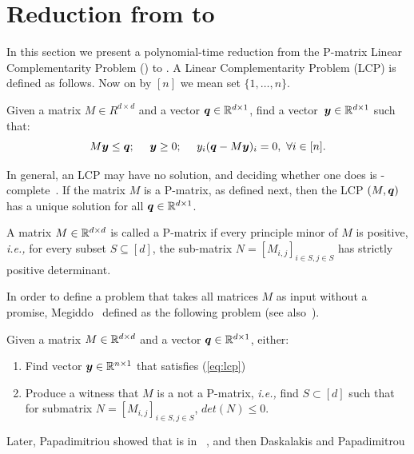 \chapter{Reduction from \PLCP to \EOPL}
\label{sec:PLCPtoEOPL}

In this section we present a polynomial-time reduction from the P-matrix Linear
Complementarity Problem (\PLCP) to \EOPL.
A Linear Complementarity Problem (LCP) is defined as follows. Now on by $[n]$ we mean set $\{1,\dots,n\}$.

\begin{definition}[LCP]
\label{def:lcp}
Given a matrix $M \in R^{d \times d}$ and a vector $\mbox{\boldmath $q$}\in \mathbb{R}^{d\times 1}$,
find a vector~{$\mbox{\boldmath $y$}\in \mathbb{R}^{d \times 1}$} such that:
\begin{equation}\label{eq:lcp}
M\mbox{\boldmath $y$}\le \mbox{\boldmath $q$};\ \ \ \ \mbox{\boldmath $y$}\ge 0;\ \ \ \ y_i(\mbox{\boldmath $q$} - M\mbox{\boldmath $y$})_i =0,\ \forall i \in [n].
\end{equation}
\end{definition}
%
In general, an LCP may have no solution, and deciding whether one does is
\NP-complete~\cite{chung1989np}. If the matrix $M$ is a P-matrix, as defined
next, then the LCP $(M,\mbox{\boldmath $q$})$ has a unique solution for all $\mbox{\boldmath $q$}\in \mathbb{R}^{d\times
1}$.
%
\begin{definition}[P-matrix]
\label{def:Pmatrix}
A matrix $M \in \mathbb{R}^{d \times d}$ is called a P-matrix if every principle
minor of $M$ is positive, {\em i.e.,} for every subset $S\subseteq[d]$, the
sub-matrix $N=[M_{i,j}]_{i\in S, j\in S}$ has strictly positive determinant. 
\end{definition}
%
In order to define a problem that takes all matrices $M$ as input without 
a promise, Megiddo~\cite{megiddo1988note} defined \PLCP as the following problem
(see also~\cite{megiddo1991total}).
%
\begin{definition}[\PLCP] \label{def:plcp} Given a matrix $M\in \mathbb{R}^{d\times
d}$ and a vector $\mbox{\boldmath $q$}\in \mathbb{R}^{d\times 1}$, either:
\begin{enumerate}[label=(Q\arabic*)] \item Find vector $\mbox{\boldmath $y$} \in \mathbb{R}^{n
			\times 1}$ that satisfies (\ref{eq:lcp}) \item Produce a witness
that $M$ is a not a P-matrix, {\em i.e.,} find $S\subset [d]$ such that for
submatrix $N=[M_{i,j}]_{i\in S, j\in S}$, $det(N)\le 0$.  \end{enumerate}
\end{definition}
%
Later, Papadimitriou showed that \PLCP is in
\PPAD~\cite{papadimitriou1994complexity}, and then Daskalakis and Papadimitrou
